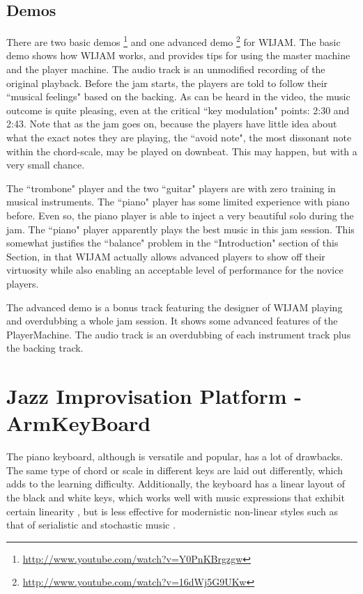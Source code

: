 \subsection{Demos}
There are two basic demos \footnote{\url{http://www.youtube.com/watch?v=Y0PnKBrgzgw}} and one advanced demo \footnote{\url{http://www.youtube.com/watch?v=16dWj5G9UKw}} for WIJAM. The basic demo shows how WIJAM works, and provides tips for using the master machine and the player machine. The audio track is an unmodified recording of the original playback. Before the jam starts, the players are told to follow their ``musical feelings" based on the backing. As can be heard in the video, the music outcome is quite pleasing, even at the critical ``key modulation" points: 2:30 and 2:43. Note that as the jam goes on, because the players have little idea about what the exact notes they are playing, the ``avoid note", the most dissonant note within the chord-scale, may be played on downbeat. This may happen, but with a very small chance.

The ``trombone" player and the two ``guitar" players are with zero training in musical instruments. The ``piano" player has some limited
experience with piano before. Even so, the piano player is able to inject a very beautiful solo during the jam. The ``piano" player apparently plays the best music in this jam session. This somewhat justifies the ``balance" problem in the ``Introduction" section of this Section, in that WIJAM actually allows advanced players to show off their virtuosity while also enabling an acceptable level of performance for the novice players.

The advanced demo is a bonus track featuring the designer of WIJAM playing and overdubbing a whole jam session. It shows some advanced features of the PlayerMachine. The audio track is an overdubbing of each instrument track plus the backing track.

\section{Jazz Improvisation Platform - ArmKeyBoard} \label{sec:5-akb}
The piano keyboard, although is versatile and popular, has a lot of drawbacks. The same type of chord or scale in different keys are laid out differently, which adds to the learning difficulty. Additionally, the keyboard has a linear layout of the black and white keys, which works well with music expressions that exhibit certain linearity , but is less effective for modernistic non-linear styles such as that of serialistic and stochastic music \cite{Mitsuko:Schoenberg}.

